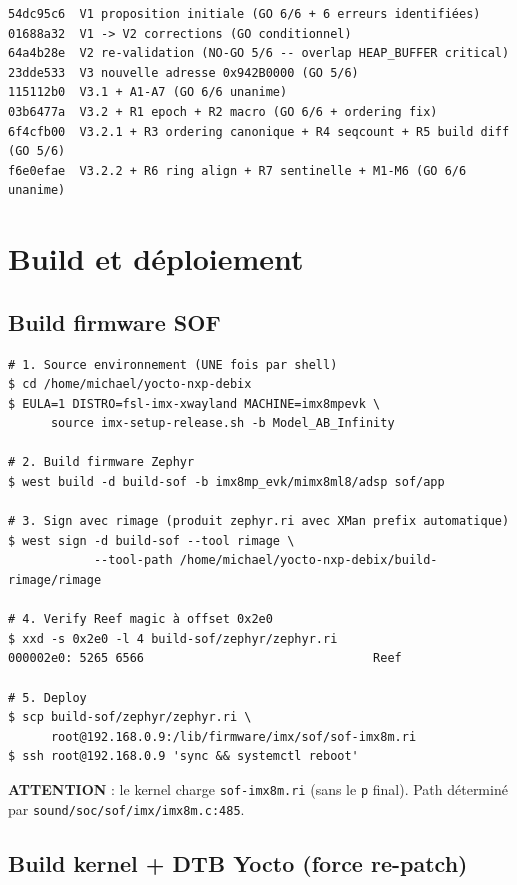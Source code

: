 \documentclass[11pt,a4paper]{article}
\begin{document}
\begin{lstlisting}
54dc95c6  V1 proposition initiale (GO 6/6 + 6 erreurs identifiées)
01688a32  V1 -> V2 corrections (GO conditionnel)
64a4b28e  V2 re-validation (NO-GO 5/6 -- overlap HEAP_BUFFER critical)
23dde533  V3 nouvelle adresse 0x942B0000 (GO 5/6)
115112b0  V3.1 + A1-A7 (GO 6/6 unanime)
03b6477a  V3.2 + R1 epoch + R2 macro (GO 6/6 + ordering fix)
6f4cfb00  V3.2.1 + R3 ordering canonique + R4 seqcount + R5 build diff (GO 5/6)
f6e0efae  V3.2.2 + R6 ring align + R7 sentinelle + M1-M6 (GO 6/6 unanime)
\end{lstlisting}

\section{Build et déploiement}

\subsection{Build firmware SOF}

\begin{lstlisting}
# 1. Source environnement (UNE fois par shell)
$ cd /home/michael/yocto-nxp-debix
$ EULA=1 DISTRO=fsl-imx-xwayland MACHINE=imx8mpevk \
      source imx-setup-release.sh -b Model_AB_Infinity

# 2. Build firmware Zephyr
$ west build -d build-sof -b imx8mp_evk/mimx8ml8/adsp sof/app

# 3. Sign avec rimage (produit zephyr.ri avec XMan prefix automatique)
$ west sign -d build-sof --tool rimage \
            --tool-path /home/michael/yocto-nxp-debix/build-rimage/rimage

# 4. Verify Reef magic à offset 0x2e0
$ xxd -s 0x2e0 -l 4 build-sof/zephyr/zephyr.ri
000002e0: 5265 6566                                Reef

# 5. Deploy
$ scp build-sof/zephyr/zephyr.ri \
      root@192.168.0.9:/lib/firmware/imx/sof/sof-imx8m.ri
$ ssh root@192.168.0.9 'sync && systemctl reboot'
\end{lstlisting}

\textbf{ATTENTION} : le kernel charge \texttt{sof-imx8m.ri} (sans le \texttt{p}
final). Path déterminé par \texttt{sound/soc/sof/imx/imx8m.c:485}.

\subsection{Build kernel + DTB Yocto (force re-patch)}
\end{document}
